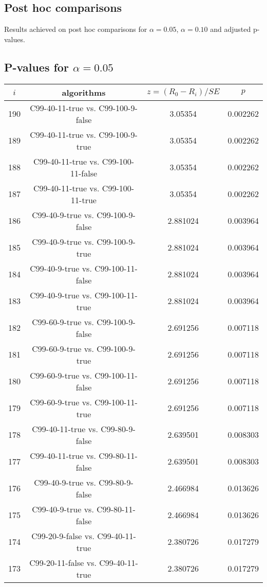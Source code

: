 \documentclass[a4paper,10pt]{article}
\begin{document}
\begin{landscape}
\pagebreak

\section{Post hoc comparisons}

Results achieved on post hoc comparisons for $\alpha = 0.05$, $\alpha = 0.10$ and adjusted p-values.

\subsection{P-values for $\alpha=0.05$}

\begin{table}[!htp]
\centering\scriptsize
\begin{tabular}{cccc}
$i$&algorithms&$z=(R_0 - R_i)/SE$&$p$\\
\hline190&C99-40-11-true vs. C99-100-9-false&3.05354&0.002262\\
189&C99-40-11-true vs. C99-100-9-true&3.05354&0.002262\\
188&C99-40-11-true vs. C99-100-11-false&3.05354&0.002262\\
187&C99-40-11-true vs. C99-100-11-true&3.05354&0.002262\\
186&C99-40-9-true vs. C99-100-9-false&2.881024&0.003964\\
185&C99-40-9-true vs. C99-100-9-true&2.881024&0.003964\\
184&C99-40-9-true vs. C99-100-11-false&2.881024&0.003964\\
183&C99-40-9-true vs. C99-100-11-true&2.881024&0.003964\\
182&C99-60-9-true vs. C99-100-9-false&2.691256&0.007118\\
181&C99-60-9-true vs. C99-100-9-true&2.691256&0.007118\\
180&C99-60-9-true vs. C99-100-11-false&2.691256&0.007118\\
179&C99-60-9-true vs. C99-100-11-true&2.691256&0.007118\\
178&C99-40-11-true vs. C99-80-9-false&2.639501&0.008303\\
177&C99-40-11-true vs. C99-80-11-false&2.639501&0.008303\\
176&C99-40-9-true vs. C99-80-9-false&2.466984&0.013626\\
175&C99-40-9-true vs. C99-80-11-false&2.466984&0.013626\\
174&C99-20-9-false vs. C99-40-11-true&2.380726&0.017279\\
173&C99-20-11-false vs. C99-40-11-true&2.380726&0.017279\\

\end{tabular}
\end{table}
\end{landscape}
\end{document}
